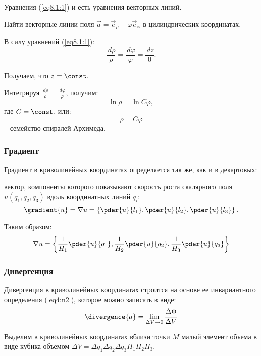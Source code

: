 	Уравнения (\ref{eq8.1:1}) и есть уравнения векторных линий.
	
	\begin{example}
	Найти векторные линии поля \( \vec{a} = \vec{e}_\rho + \varphi\vec{e}_\varphi \) в цилиндрических координатах.
	\end{example}
	\begin{solution}
	
	В силу уравнений (\ref{eq8.1:1}):
	\[ \frac{\,d\rho}{\rho} = \frac{\,d\varphi}{\varphi} = \frac{\,d z}{0}. \]
	
	Получаем, что \( z = \const \).
	
	Интегрируя \( \frac{\,d\rho}{\rho} = \frac{\,d\varphi}{\varphi} \), получим:
	\[ \ln\rho = \ln C\varphi, \]
	где \( C = \const \), или:
	\[ \rho = C\varphi \] -- семейство спиралей Архимеда.
	\end{solution}

\subsubsection{Градиент}

	Градиент в криволинейных координатах определяется так же, как и в декартовых:
	
	вектор, компоненты которого показывают скорость роста скалярного поля \( u(q_1, q_2, q_3) \) вдоль координатных линий \( q_i \):
	\[ \gradient{u} = \nabla u = \left\{ \pder{u}{l_1}, \pder{u}{l_2}, \pder{u}{l_3} \right\}. \]
	
	Таким образом:
	\begin{equation}
		\nabla u = \left\{ \frac{1}{H_1}\pder{u}{q_1}, \frac{1}{H_2}\pder{u}{q_2}, \frac{1}{H_3}\pder{u}{q_3} \right\} \label{eq8.1:2}
	\end{equation}

\subsubsection{Дивергенция}

	Дивергенция в криволинейных координатах строится на основе ее инвариантного определения (\ref{eq4:n2}), которое можно записать в виде:
	\begin{equation}
		\divergence{a} = \lim_{\Delta V\to0} \frac{\Delta\Phi}{\Delta V} \label{eq8.1:3}
	\end{equation}
	
	Выделим в криволинейных координатах вблизи точки \( M \) малый элемент объема в виде кубика объемом \( \Delta V = \Delta q_1\Delta q_2\Delta q_3H_1H_2H_3 \).
	

